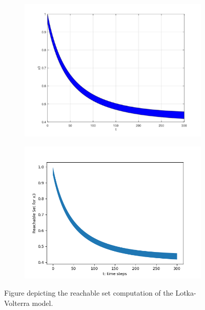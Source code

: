 \documentclass[EPiC]{easychair}
\begin{document}
\begin{figure}[h]
    \begin{subfigure}{0.5\textwidth}
    \centering
    \includegraphics[width=\textwidth]{SapoFigures/LV/SapoLV_X3.jpg}
    \end{subfigure}
    \begin{subfigure}{0.6\textwidth}
    \centering
    \includegraphics[width=\textwidth]{SapoFigures/LV/KaaLV_X3.png}
    \end{subfigure}
    
    \caption{Figure depicting the reachable set computation of the Lotka-Volterra model.} 
    \label{fig4}
\end{figure}
\end{document}
